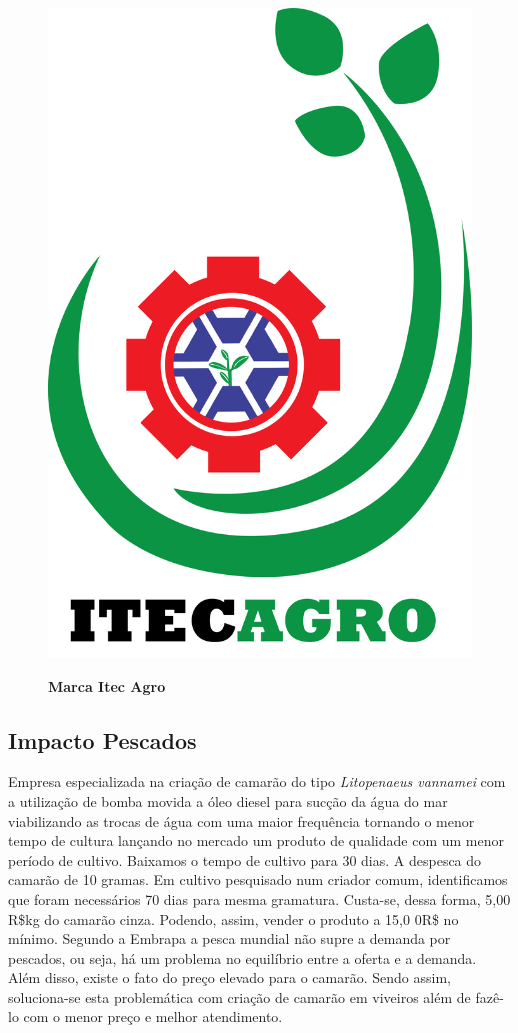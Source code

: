 \begin{figure}[!htb]
\centering
\caption{\textbf{Marca Itec Agro}}
\includegraphics[scale=0.05]{Imagens/itecagro.png}
\label{figura_46}
\end{figure}
\newpage

\subsection{Impacto Pescados}

Empresa especializada na criação de camarão do tipo \textit{Litopenaeus vannamei} com a utilização de bomba movida a óleo diesel para sucção da água do mar viabilizando as trocas de água com uma maior frequência tornando o menor tempo de cultura lançando no mercado um produto de qualidade com um menor período de cultivo. Baixamos o tempo de cultivo para 30 dias. A despesca do camarão de 10 gramas. Em cultivo pesquisado num criador comum, identificamos que foram necessários 70 dias para mesma gramatura. Custa-se, dessa forma, 5,00 R\$kg do camarão cinza. Podendo, assim, vender o produto a 15,0 0R\$ no mínimo. Segundo a Embrapa a pesca mundial não supre a demanda por pescados, ou seja, há um problema no equilíbrio entre a oferta e a demanda. Além disso, existe o fato do preço elevado para o camarão. Sendo assim, soluciona-se esta problemática com criação de camarão em viveiros além de fazê-lo com o menor preço e melhor atendimento.

